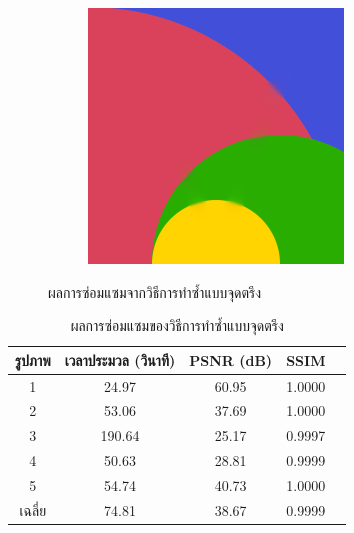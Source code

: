 \begin{figure}[H]
\begin{subfigure}{0.4\linewidth}
		\includegraphics[width=0.8\linewidth]{image/result_ex1/fixpoint05.png}			
	\end{subfigure}
	\caption{ผลการซ่อมแซมจากวิธีการทำซ้ำแบบจุดตรึง}
\end{figure}
\begin{table}[H]
	\centering
	\begin{tabular}[ht]{|c|c|c|c|c|}
		\hline
		รูปภาพ &เวลาประมวล  (วินาที) & PSNR (dB) & SSIM \\
		\hline
		1 & 24.97 & 60.95 & 1.0000 \\ 
		2 & 53.06 & 37.69 & 1.0000 \\
		3 &  190.64 & 25.17 & 0.9997 \\
		4 & 50.63  & 28.81  & 0.9999 \\
		5 & 54.74  & 40.73  & 1.0000 \\
		\hline
		เฉลี่ย & 74.81  & 38.67  & 0.9999 \\
		\hline
	\end{tabular}
	\caption{ผลการซ่อมแซมของวิธีการทำซ้ำแบบจุดตรึง}
\end{table}	
